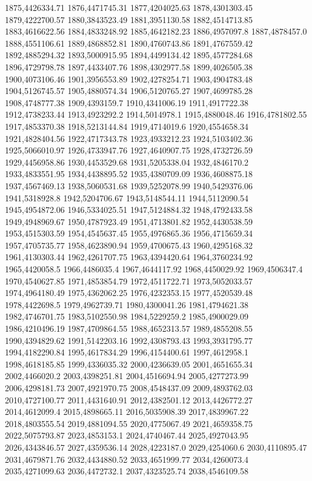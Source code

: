 1875,4426334.71
1876,4471745.31
1877,4204025.63
1878,4301303.45
1879,4222700.57
1880,3843523.49
1881,3951130.58
1882,4514713.85
1883,4616622.56
1884,4833248.92
1885,4642182.23
1886,4957097.8
1887,4878457.0
1888,4551106.61
1889,4868852.81
1890,4760743.86
1891,4767559.42
1892,4885294.32
1893,5000915.95
1894,4499134.42
1895,4577284.68
1896,4729798.78
1897,4433407.76
1898,4302977.58
1899,4026505.38
1900,4073106.46
1901,3956553.89
1902,4278254.71
1903,4904783.48
1904,5126745.57
1905,4880574.34
1906,5120765.27
1907,4699785.28
1908,4748777.38
1909,4393159.7
1910,4341006.19
1911,4917722.38
1912,4738233.44
1913,4923292.2
1914,5014978.1
1915,4880048.46
1916,4781802.55
1917,4853370.38
1918,5213144.84
1919,4714019.6
1920,4554658.34
1921,4828404.56
1922,4717343.78
1923,4933212.23
1924,5103402.36
1925,5066010.97
1926,4733947.76
1927,4640907.75
1928,4732726.59
1929,4456958.86
1930,4453529.68
1931,5205338.04
1932,4846170.2
1933,4833551.95
1934,4438895.52
1935,4380709.09
1936,4608875.18
1937,4567469.13
1938,5060531.68
1939,5252078.99
1940,5429376.06
1941,5318928.8
1942,5204706.67
1943,5148544.11
1944,5112090.54
1945,4954872.06
1946,5334025.51
1947,5124884.32
1948,4792433.58
1949,4948969.67
1950,4787923.49
1951,4713801.82
1952,4430538.59
1953,4515303.59
1954,4545637.45
1955,4976865.36
1956,4715659.34
1957,4705735.77
1958,4623890.94
1959,4700675.43
1960,4295168.32
1961,4130303.44
1962,4261707.75
1963,4394420.64
1964,3760234.92
1965,4420058.5
1966,4486035.4
1967,4644117.92
1968,4450029.92
1969,4506347.4
1970,4540627.85
1971,4853854.79
1972,4511722.71
1973,5052033.57
1974,4964180.49
1975,4362062.25
1976,4232353.15
1977,4520539.48
1978,4422698.5
1979,4962739.71
1980,4300041.26
1981,4794621.38
1982,4746701.75
1983,5102550.98
1984,5229259.2
1985,4900029.09
1986,4210496.19
1987,4709864.55
1988,4652313.57
1989,4855208.55
1990,4394829.62
1991,5142203.16
1992,4308793.43
1993,3931795.77
1994,4182290.84
1995,4617834.29
1996,4154400.61
1997,4612958.1
1998,4618185.85
1999,4336035.32
2000,4236639.05
2001,4651655.34
2002,4466020.2
2003,4398251.81
2004,4516694.94
2005,4277273.99
2006,4298181.73
2007,4921970.75
2008,4548437.09
2009,4893762.03
2010,4727100.77
2011,4431640.91
2012,4382501.12
2013,4426772.27
2014,4612099.4
2015,4898665.11
2016,5035908.39
2017,4839967.22
2018,4803555.54
2019,4881094.55
2020,4775067.49
2021,4659358.75
2022,5075793.87
2023,4853153.1
2024,4740467.44
2025,4927043.95
2026,4343846.57
2027,4359536.14
2028,4223187.0
2029,4254060.6
2030,4110895.47
2031,4679871.76
2032,4434880.52
2033,4651999.77
2034,4260073.4
2035,4271099.63
2036,4472732.1
2037,4323525.74
2038,4546109.58
